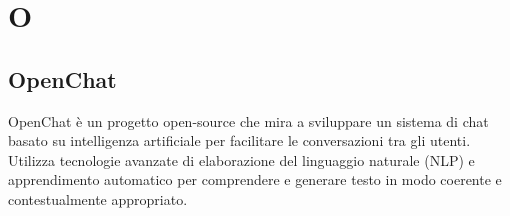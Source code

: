 \section{O}

\vspace{2em}
\subsection*{OpenChat}
OpenChat è un progetto open-source che mira a sviluppare un sistema di chat basato su intelligenza artificiale per facilitare le conversazioni tra gli utenti. Utilizza tecnologie avanzate di elaborazione del linguaggio naturale (NLP) e apprendimento automatico per comprendere e generare testo in modo coerente e contestualmente appropriato.